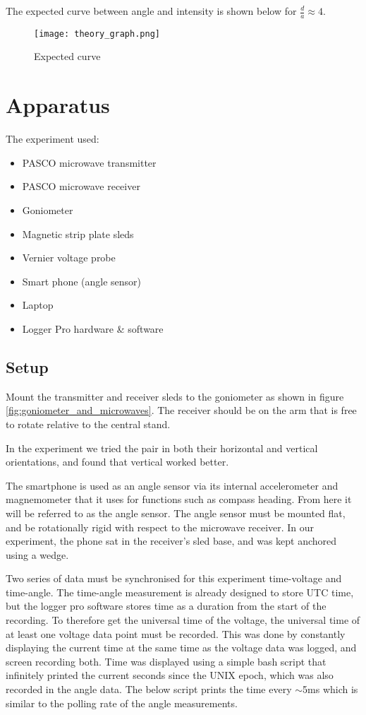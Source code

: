 The expected curve between angle and intensity is shown below for $\frac{d}{a} \approx 4$.
\begin{figure}[h]
\centering
\texttt{[image: theory\_graph.png]}
\caption{Expected curve}
\label{fig:ExpectedCurve}
\end{figure}

\section*{Apparatus}

The experiment used:
\begin{itemize}
\item PASCO microwave transmitter
\item PASCO microwave receiver
\item Goniometer
\item Magnetic strip plate sleds
\item Vernier voltage probe
\item Smart phone (angle sensor)
\item Laptop
\item Logger Pro hardware \& software
\end{itemize}

\subsection*{Setup}

Mount the transmitter and receiver sleds to the goniometer as shown in figure \ref{fig:goniometer_and_microwaves}. The receiver should be on the arm that is free to rotate relative to the central stand.

In the experiment we tried the pair in both their horizontal and vertical orientations, and found that vertical worked better.

The smartphone is used as an angle sensor via its internal accelerometer and magnemometer that it uses for functions such as compass heading. From here it will be referred to as the angle sensor. The angle sensor must be mounted flat, and be rotationally rigid with respect to the microwave receiver. In our experiment, the phone sat in the receiver's sled base, and was kept anchored using a wedge.

Two series of data must be synchronised for this experiment \textemdash time-voltage and time-angle. The time-angle measurement is already designed to store UTC time, but the logger pro software stores time as a duration from the start of the recording. To therefore get the universal time of the voltage, the universal time of at least one voltage data point must be recorded. This was done by constantly displaying the current time at the same time as the voltage data was logged, and screen recording both. Time was displayed using a simple bash script that infinitely printed the current seconds since the UNIX epoch, which was also recorded in the angle data. The below script prints the time every $\sim$5ms which is similar to the polling rate of the angle measurements.


